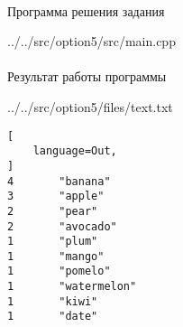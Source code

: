 \paragraph{} Программа решения задания


{../../src/option5/src/main.cpp}

\paragraph{} Результат работы программы


{../../src/option5/files/text.txt}

\begin{lstlisting}[
    language=Out,
]
4       "banana"
3       "apple"
2       "pear"
2       "avocado"
1       "plum"
1       "mango"
1       "pomelo"
1       "watermelon"
1       "kiwi"
1       "date"
\end{lstlisting}